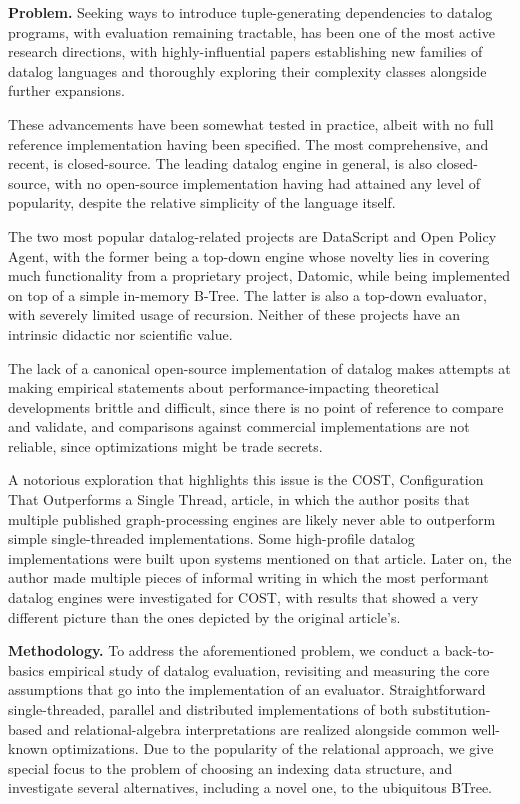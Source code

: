 \documentclass[manuscript,screen,review]{acmart}
\theoremstyle{definition}
\begin{document}
\textbf{Problem.} Seeking ways to introduce tuple-generating dependencies to datalog
programs, with evaluation remaining tractable, has been one of the most active research
directions, with highly-influential papers establishing new families of datalog languages\cite{datalog_plus_minus}
and thoroughly exploring their complexity classes alongside further expansions\cite{sticky,warded,monadic}.

These advancements have been somewhat tested in practice, albeit with no full reference implementation having
been specified. The most comprehensive, and recent, is closed-source\cite{vadalog}. The
leading datalog engine in general, is also closed-source\cite{rdfox}, with no open-source
implementation having had attained any level of popularity, despite the relative simplicity
of the language itself.

The two most popular datalog-related projects are DataScript\cite{datascript} and
Open Policy Agent\cite{opa}, with the former being a top-down engine whose novelty lies in
covering much functionality from a proprietary project, Datomic\cite{datomic}, while being
implemented on top of a simple in-memory B-Tree. The latter is also a top-down evaluator,
with severely limited usage of recursion. Neither of these projects have an intrinsic didactic
nor scientific value.

The lack of a canonical open-source implementation of datalog makes attempts at making
empirical statements about performance-impacting theoretical developments brittle and
difficult, since there is no point of reference to compare and validate, and comparisons
against commercial implementations are not reliable, since optimizations might be trade secrets.

A notorious exploration that highlights this issue is the COST, Configuration That Outperforms
a Single Thread, article\cite{COST}, in which the author posits that multiple published
graph-processing engines are likely never able to outperform simple single-threaded implementations.
Some high-profile datalog implementations were built upon systems mentioned on that article.
Later on, the author made multiple pieces of informal writing in which the most performant datalog
engines were investigated for COST\cite{blogdynamicdatalog, blogvldbsigmod}, with results that
showed a very different picture than the ones depicted by the original article's.

\textbf{Methodology.} To address the aforementioned problem, we conduct a back-to-basics
empirical study of datalog evaluation, revisiting and measuring the core assumptions that go
into the implementation of an evaluator. Straightforward single-threaded, parallel and distributed
implementations of both substitution-based and relational-algebra interpretations are realized alongside common
well-known optimizations. Due to the popularity of the relational approach, we give special focus
to the problem of choosing an indexing data structure, and investigate several alternatives, including
a novel one, to the ubiquitous BTree.
\end{document}

